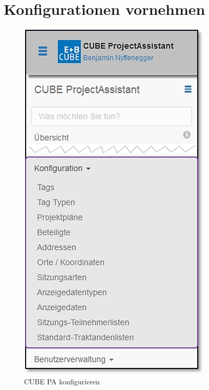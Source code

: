 
\clearpage
\section{Konfigurationen vornehmen}

\begin{figure}   %
  \vspace{-35pt}      %
  \begin{center}
    \includegraphics[width=1\linewidth]{../chapters/13_Konfigurationen/pictures/13_Menu_Konfiguration.jpg}
  \end{center}
  \vspace{-20pt}
  \caption{CUBE PA konfigurieren}
  \vspace{-10pt}
\end{figure}

